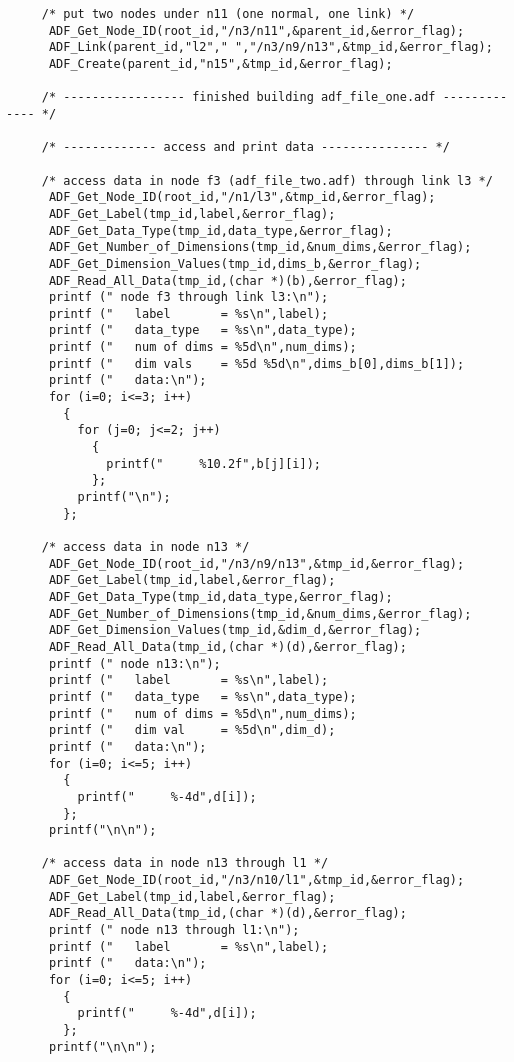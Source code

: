 \begin{verbatim}
     /* put two nodes under n11 (one normal, one link) */
      ADF_Get_Node_ID(root_id,"/n3/n11",&parent_id,&error_flag);
      ADF_Link(parent_id,"l2"," ","/n3/n9/n13",&tmp_id,&error_flag);
      ADF_Create(parent_id,"n15",&tmp_id,&error_flag);

     /* ----------------- finished building adf_file_one.adf ------------- */

     /* ------------- access and print data --------------- */

     /* access data in node f3 (adf_file_two.adf) through link l3 */
      ADF_Get_Node_ID(root_id,"/n1/l3",&tmp_id,&error_flag);
      ADF_Get_Label(tmp_id,label,&error_flag);
      ADF_Get_Data_Type(tmp_id,data_type,&error_flag);
      ADF_Get_Number_of_Dimensions(tmp_id,&num_dims,&error_flag);
      ADF_Get_Dimension_Values(tmp_id,dims_b,&error_flag);
      ADF_Read_All_Data(tmp_id,(char *)(b),&error_flag);
      printf (" node f3 through link l3:\n");
      printf ("   label       = %s\n",label);
      printf ("   data_type   = %s\n",data_type);
      printf ("   num of dims = %5d\n",num_dims);
      printf ("   dim vals    = %5d %5d\n",dims_b[0],dims_b[1]);
      printf ("   data:\n");
      for (i=0; i<=3; i++)
        {
          for (j=0; j<=2; j++)
            {
              printf("     %10.2f",b[j][i]);
            };
          printf("\n");
        };

     /* access data in node n13 */
      ADF_Get_Node_ID(root_id,"/n3/n9/n13",&tmp_id,&error_flag);
      ADF_Get_Label(tmp_id,label,&error_flag);
      ADF_Get_Data_Type(tmp_id,data_type,&error_flag);
      ADF_Get_Number_of_Dimensions(tmp_id,&num_dims,&error_flag);
      ADF_Get_Dimension_Values(tmp_id,&dim_d,&error_flag);
      ADF_Read_All_Data(tmp_id,(char *)(d),&error_flag);
      printf (" node n13:\n");
      printf ("   label       = %s\n",label);
      printf ("   data_type   = %s\n",data_type);
      printf ("   num of dims = %5d\n",num_dims);
      printf ("   dim val     = %5d\n",dim_d);
      printf ("   data:\n");
      for (i=0; i<=5; i++)
        {
          printf("     %-4d",d[i]);
        };
      printf("\n\n");

     /* access data in node n13 through l1 */
      ADF_Get_Node_ID(root_id,"/n3/n10/l1",&tmp_id,&error_flag);
      ADF_Get_Label(tmp_id,label,&error_flag);
      ADF_Read_All_Data(tmp_id,(char *)(d),&error_flag);
      printf (" node n13 through l1:\n");
      printf ("   label       = %s\n",label);
      printf ("   data:\n");
      for (i=0; i<=5; i++)
        {
          printf("     %-4d",d[i]);
        };
      printf("\n\n");


\end{verbatim}
